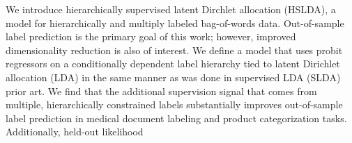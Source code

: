 We introduce hierarchically supervised latent Dirchlet allocation (HSLDA), a model for hierarchically and multiply labeled bag-of-words data.  Out-of-sample label prediction is the primary goal of this work; however, improved dimensionality reduction is also of interest.  We define a model that uses probit regressors on a conditionally dependent label hierarchy tied to latent Dirichlet allocation (LDA) in the same manner as was done in supervised LDA (SLDA) prior art.  We find that the additional supervision signal that comes from multiple, hierarchically constrained labels substantially improves out-of-sample label prediction in medical document labeling and product categorization tasks.  Additionally, held-out likelihood 


